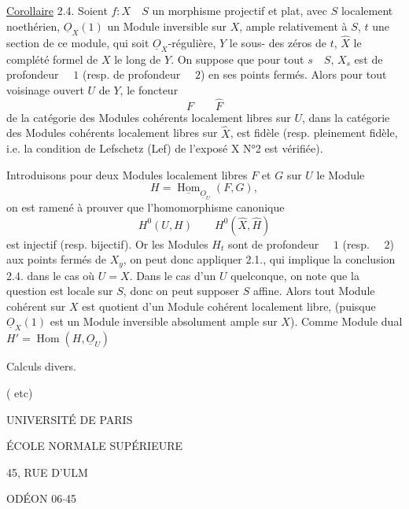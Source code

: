 \uline{Corollaire} 2.4. Soient $f:X\quad S$ un morphisme projectif et plat, avec $S$ localement noethérien, $\underline O_X(1)$ un Module inversible sur $X$, ample relativement à $S$, $t$ une section de ce module, qui soit $\underline O_X$-régulière, $Y$  le sous- des zéros de $t$, $\widehat X$ le complété formel de $X$ le long de $Y$. On suppose que pour tout $s\quad S$, $X_s$ est de profondeur $\quad1$ (resp. de profondeur $\quad2$) en ses points fermés. Alors pour tout voisinage ouvert $U$ de $Y$, le foncteur
\[
F\qquad\widehat F
\]
de la catégorie des Modules cohérents localement libres sur $U$, dans la catégorie des Modules cohérents localement libres sur $\widehat X$, est fidèle (resp. pleinement fidèle, i.e. la condition  de Lefschetz (Lef) de l'exposé X N°2 est vérifiée).

Introduisons  pour deux Modules localement libres $F$ et $G$ sur $U$ le Module
\[
H=\underline{\operatorname{Hom}}_{\underline O_U}(F,G),
\]
on est ramené à prouver que l'homomorphisme canonique
\[
H^0(U,H)\qquad H^0(\widehat X,\widehat H)
\]
est injectif (resp. bijectif). Or les Modules $H_t$ sont de profondeur $\quad1$ (resp. $\quad2$) aux points fermés de $X_y$, on peut donc appliquer 2.1., qui implique la conclusion 2.4. dans le cas où $U=X$. Dans le cas d'un $U$ quelconque, on note que la question est locale sur $S$, donc on peut supposer $S$ affine. Alors tout Module cohérent sur $X$ est quotient d'un Module cohérent localement libre, (puisque $\underline O_X(1)$ est un Module inversible absolument ample sur $X$). Comme  Module dual $H'=\operatorname{Hom}(H,\underline O_U)$


Calculs divers.

(  etc)



\begin{center}
UNIVERSITÉ DE PARIS


ÉCOLE NORMALE SUPÉRIEURE


45, RUE D'ULM

ODÉON 06$\cdot$45

\end{center}

